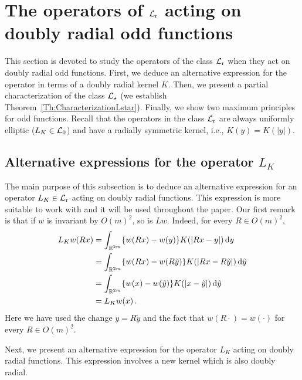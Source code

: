 \section{The operators of $\mathcal{L}_{\mathrm{r}}$ acting on doubly radial odd functions}
\label{Sec:OperatorOddF}

This section is devoted to study the operators of the class $\mathcal{L}_{\mathrm{r}}$ when they act on doubly radial odd functions. First, we deduce an alternative expression for the operator in terms of a doubly radial kernel $\overline{K}$. Then, we present a partial characterization of the class $\mathcal{L}_\star$ (we establish Theorem~\ref{Th:CharacterizationLstar}). Finally, we show two maximum principles for odd functions. Recall that the operators in the class $\mathcal{L}_{\mathrm{r}}$ are always uniformly elliptic ($L_K \in \mathcal{L}_0$) and have a radially symmetric kernel, i.e., $K(y) = K(|y|)$.  


\subsection{Alternative expressions for the operator $L_K$}

The main purpose of this subsection is to deduce an alternative expression for an operator $L_K \in \mathcal{L}_{\mathrm{r}}$ acting on doubly radial functions. This expression is more suitable to work with and it will be used throughout the paper. Our first remark is that if $w$ is invariant by $O(m)^2$, so is $Lw$. Indeed, for every $R \in O(m)^2$,
\begin{align*}
L_K w (Rx)
& = \int_{\mathbb{R}^{2m}} \{w(Rx) - w(y)\} K(|Rx - y|)  \,\mathrm{d} y\\
& = \int_{\mathbb{R}^{2m}} \{w(Rx) - w(R\tilde{y})\} K(|Rx - R\tilde{y}|) \,\mathrm{d} \tilde{y}\\
& = \int_{\mathbb{R}^{2m}} \{w(x) - w(\tilde{y})\} K(|x-\tilde{y}|) \,\mathrm{d} \tilde{y}\\
& = L_K w (x)\,.
\end{align*}
Here we have used the change $y = R\tilde{y}$ and the fact that $w(R \cdot) = w(\cdot)$ for every $R\in O(m)^2$.

Next, we present an alternative expression for the operator $L_K $ acting on doubly radial functions. This expression involves a new kernel which is also doubly radial.

